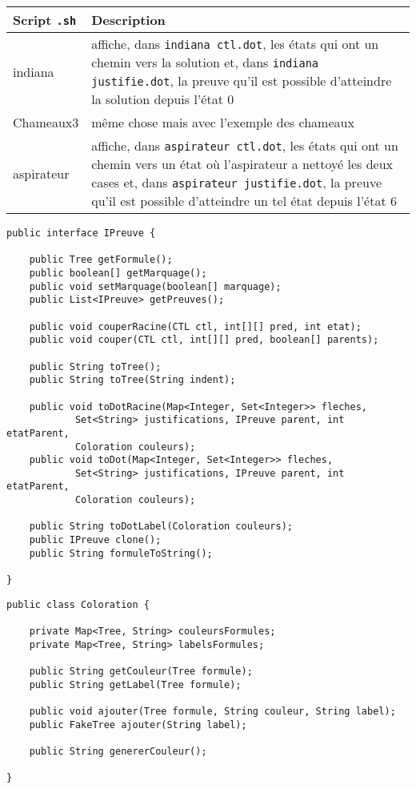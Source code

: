 \documentclass[dvipsnames]{report}
\begin{document}
\noindent\begin{tabularx}{\linewidth}{| @{}l | X@{} |}
\hline
Script \texttt{.sh} & Description \\
\hline
indiana & affiche, dans \texttt{indiana ctl.dot}, les états qui ont un chemin vers la solution et, dans \texttt{indiana justifie.dot}, la preuve qu'il est possible d'atteindre la solution depuis l'état 0 \\
\hline
Chameaux3 & même chose mais avec l'exemple des chameaux \\
\hline
aspirateur & affiche, dans \texttt{aspirateur ctl.dot}, les états qui ont un chemin vers un état où l'aspirateur a nettoyé les deux cases et, dans \texttt{aspirateur justifie.dot}, la preuve qu'il est possible d'atteindre un tel état depuis l'état 6 \\
\hline
\end{tabularx}

\newpage

\begin{lstlisting}[caption={Interface \psverb+IPreuve+ commune à toutes les preuves}, label={lst:IPreuve}]
public interface IPreuve {

	public Tree getFormule();
	public boolean[] getMarquage();
	public void setMarquage(boolean[] marquage);
	public List<IPreuve> getPreuves();

	public void couperRacine(CTL ctl, int[][] pred, int etat);
	public void couper(CTL ctl, int[][] pred, boolean[] parents);

	public String toTree();
	public String toTree(String indent);

	public void toDotRacine(Map<Integer, Set<Integer>> fleches,
			Set<String> justifications, IPreuve parent, int etatParent,
			Coloration couleurs);
	public void toDot(Map<Integer, Set<Integer>> fleches,
			Set<String> justifications, IPreuve parent, int etatParent,
			Coloration couleurs);

	public String toDotLabel(Coloration couleurs);
	public IPreuve clone();
	public String formuleToString();

}
\end{lstlisting}

\begin{lstlisting}[caption={Classe \psverb+Coloration+}, label={lst:Coloration}]
public class Coloration {

	private Map<Tree, String> couleursFormules;
	private Map<Tree, String> labelsFormules;

	public String getCouleur(Tree formule);
	public String getLabel(Tree formule);

	public void ajouter(Tree formule, String couleur, String label);
	public FakeTree ajouter(String label);

	public String genererCouleur();

}
\end{lstlisting}
\end{document}
